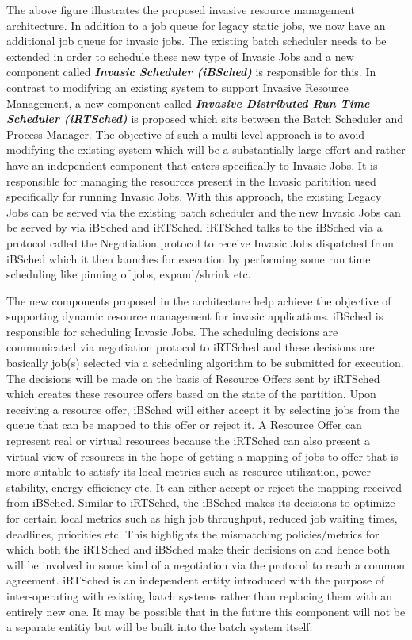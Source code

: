 The above figure illustrates the proposed invasive resource management architecture. In addition to a job queue for legacy static jobs, we now have an additional job queue for invasic jobs. The existing batch scheduler needs to be extended in order to schedule these new type of Invasic Jobs and a new component called \textbf{\textit{Invasic Scheduler (iBSched)}} is responsible for this. In contrast to modifying an existing system to support Invasive Resource Management, a new component called \textbf{\textit{Invasive Distributed Run Time Scheduler (iRTSched)}} is proposed which sits between the Batch Scheduler and Process Manager. The objective of such a multi-level approach is to avoid modifying the existing system which will be a substantially large effort and rather have an independent component that caters specifically to Invasic Jobs. It is responsible for managing the resources present in the Invasic paritition used specifically for running Invasic Jobs. With this approach, the existing Legacy Jobs can be served via the existing batch scheduler and the new Invasic Jobs can be served by via iBSched and iRTSched. iRTSched talks to the iBSched via a protocol called the Negotiation protocol to receive Invasic Jobs dispatched from iBSched which it then launches for execution by performing some run time scheduling like pinning of jobs, expand/shrink etc.\\ \par
\noindent
The new components proposed in the architecture help achieve the objective of supporting dynamic resource management for invasic applications. iBSched is responsible for scheduling Invasic Jobs. The scheduling decisions are communicated via negotiation protocol to iRTSched and these decisions are basically job(s) selected via a scheduling algorithm to be submitted for execution. The decisions will be made on the basis of Resource Offers sent by iRTSched which creates these resource offers based on the state of the partition. Upon receiving a resource offer, iBSched will either accept it by selecting jobs from the queue that can be mapped to this offer or reject it. A Resource Offer can represent real or virtual resources because the iRTSched can also present a virtual view of resources in the hope of getting a mapping of jobs to offer that is more suitable to satisfy its local metrics such as resource utilization, power stability, energy efficiency etc. It can either accept or reject the mapping received from iBSched. Similar to iRTSched, the iBSched makes its decisions to optimize for certain local metrics such as high job throughput, reduced job waiting times, deadlines, priorities etc. This highlights the mismatching policies/metrics for which both the iRTSched and iBSched make their decisions on and hence both will be involved in some kind of a negotiation via the protocol to reach a common agreement. iRTSched is an independent entity introduced with the purpose of inter-operating with existing batch systems rather than replacing them with an entirely new one. It may be possible that in the future this component will not be a separate entitiy but will be built into the batch system itself.\\ \par

